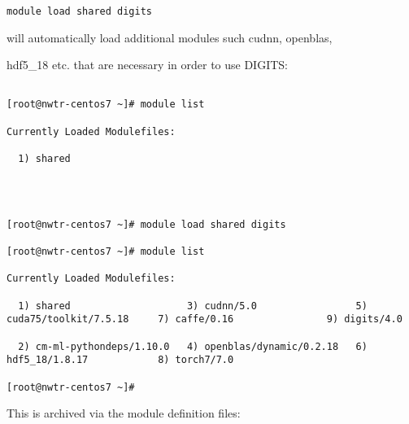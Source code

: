 \documentclass[]{article}
\begin{document}
\begin{verbatim}



module load shared digits

\end{verbatim}



will automatically load additional modules such cudnn, openblas,

hdf5\_18 etc. that are necessary in order to use DIGITS:



\begin{verbatim}

[root@nwtr-centos7 ~]# module list

Currently Loaded Modulefiles:

  1) shared

\end{verbatim}



\begin{verbatim}



[root@nwtr-centos7 ~]# module load shared digits

[root@nwtr-centos7 ~]# module list

Currently Loaded Modulefiles:

  1) shared                    3) cudnn/5.0                 5) cuda75/toolkit/7.5.18     7) caffe/0.16                9) digits/4.0

  2) cm-ml-pythondeps/1.10.0   4) openblas/dynamic/0.2.18   6) hdf5_18/1.8.17            8) torch7/7.0

[root@nwtr-centos7 ~]#

\end{verbatim}



This is archived via the module definition files:
\end{document}
